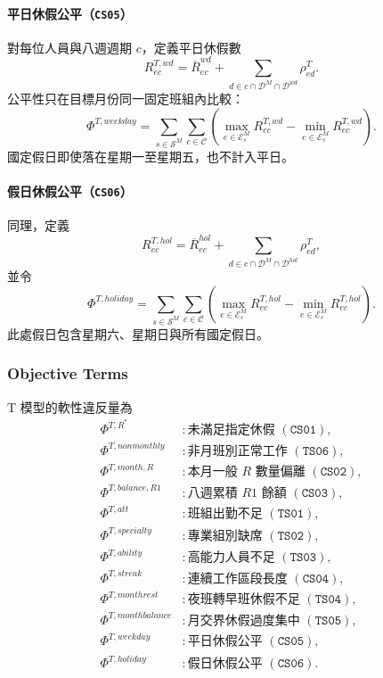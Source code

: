 \documentclass[12pt]{article}
\begin{document}
\paragraph{平日休假公平（\texttt{CS05}）}

對每位人員與八週週期 \(c\)，定義平日休假數
\[
  R^{T,wd}_{ec}
  =
  \overline{R}^{wd}_{ec}
  +
  \sum_{d\in c\cap\mathcal{D}^{M}\cap\mathcal{D}^{wd}}\rho^{T}_{ed}.
\]
公平性只在目標月份同一固定班組內比較：
\[
  \Phi^{T,weekday}
  =
  \sum_{s\in\mathcal{S}^{M}}
  \sum_{c\in\mathcal{C}}
  \left(
    \max_{e\in\mathcal{E}^{M}_{s}}R^{T,wd}_{ec}
    -
    \min_{e\in\mathcal{E}^{M}_{s}}R^{T,wd}_{ec}
  \right).
\]
國定假日即使落在星期一至星期五，也不計入平日。

\paragraph{假日休假公平（\texttt{CS06}）}

同理，定義
\[
  R^{T,hol}_{ec}
  =
  \overline{R}^{hol}_{ec}
  +
  \sum_{d\in c\cap\mathcal{D}^{M}\cap\mathcal{D}^{hol}}\rho^{T}_{ed},
\]
並令
\[
  \Phi^{T,holiday}
  =
  \sum_{s\in\mathcal{S}^{M}}
  \sum_{c\in\mathcal{C}}
  \left(
    \max_{e\in\mathcal{E}^{M}_{s}}R^{T,hol}_{ec}
    -
    \min_{e\in\mathcal{E}^{M}_{s}}R^{T,hol}_{ec}
  \right).
\]
此處假日包含星期六、星期日與所有國定假日。
\subsubsection{Objective Terms}

T 模型的軟性違反量為
\[
  \begin{aligned}
    \Phi^{T,R^*}          &: \text{未滿足指定休假 }(\texttt{CS01}),\\
    \Phi^{T,nonmonthly}   &: \text{非月班別正常工作 }(\texttt{TS06}),\\
    \Phi^{T,month,R}      &: \text{本月一般 }R\text{ 數量偏離 }(\texttt{CS02}),\\
    \Phi^{T,balance,R1}   &: \text{八週累積 }R1\text{ 餘額 }(\texttt{CS03}),\\
    \Phi^{T,att}          &: \text{班組出勤不足 }(\texttt{TS01}),\\
    \Phi^{T,specialty}    &: \text{專業組別缺席 }(\texttt{TS02}),\\
    \Phi^{T,ability}      &: \text{高能力人員不足 }(\texttt{TS03}),\\
    \Phi^{T,streak}       &: \text{連續工作區段長度 }(\texttt{CS04}),\\
    \Phi^{T,monthrest}    &: \text{夜班轉早班休假不足 }(\texttt{TS04}),\\
    \Phi^{T,monthbalance} &: \text{月交界休假過度集中 }(\texttt{TS05}),\\
    \Phi^{T,weekday}      &: \text{平日休假公平 }(\texttt{CS05}),\\
    \Phi^{T,holiday}      &: \text{假日休假公平 }(\texttt{CS06}).
  \end{aligned}
\]
\end{document}
